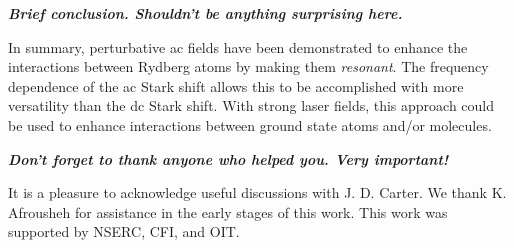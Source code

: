 \documentclass[letterpaper,twocolumn,showpacs,preprintnumbers,amsmath,amssymb,prl,nolongbibliography]{revtex4-2}
\begin{document}
\textbf{\emph{Brief conclusion.  Shouldn't be anything surprising here.}}

In summary, perturbative ac fields have been demonstrated
to enhance the interactions between Rydberg atoms by making them
{\em resonant}.  The frequency dependence of the ac Stark shift
allows this to be accomplished with more versatility than
the dc Stark shift.  With strong laser fields, this approach
could be used to enhance interactions between ground state atoms
and/or molecules.

\textbf{\emph{Don't forget to thank anyone who helped you.  Very important!}}

It is a pleasure to acknowledge useful discussions with J. D. Carter.
We thank K. Afrousheh for assistance in the early stages of this work.
This work was supported by NSERC, CFI, and OIT.


\end{document}
